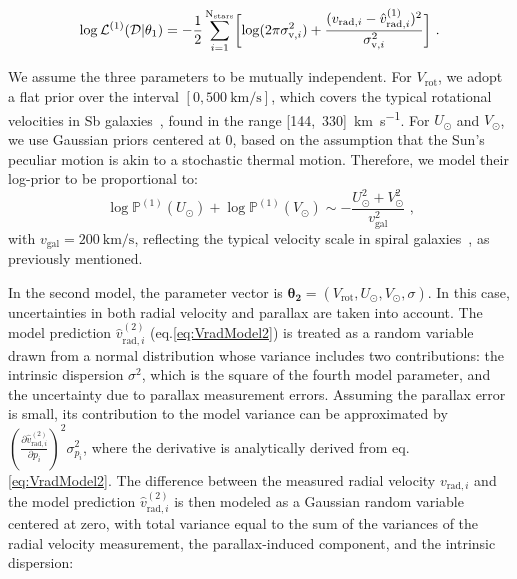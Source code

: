 \begin{equation}\label{Eq:LogLikeMod1}
    \log \mathcal{L}^{(1)}(\mathcal{D} \vert \theta_1) = -\frac{1}{2}\sum_{i=1}^{\text{N}_{\text{stars}}}\biggl[\log(2\pi\sigma_{\text{v},i}^2)+\frac{(v_{\text{rad},i} - \hat{v}_{\text{rad},i}^{(1)})^2}{\sigma_{\text{v},i}^2}\biggr] \text{ .}
\end{equation}

We assume the three parameters to be mutually independent. For $V_{\text{rot}}$, we adopt a flat prior over the interval $[0,\qty{500}{\kilo\meter\per\second}]$, which covers the typical rotational velocities in Sb galaxies~\cite{Schneider2015}, found in the range [144,~330]~\unit{\kilo\meter\per\second}\cite{Schneider2015}. For $U_\odot$ and $V_\odot$, we use Gaussian priors centered at 0, based on the assumption that the Sun's peculiar motion is akin to a stochastic thermal motion. Therefore, we model their log-prior to be proportional to:
\begin{equation*}
    \log\mathbb{P}^{(1)}(U_\odot) + \log\mathbb{P}^{(1)}(V_\odot) \sim - \frac{U_\odot^2 + V_{\odot}^2}{v_{\text{gal}}^2} \text{ ,}
\end{equation*}
\noindent
with $v_{\text{gal}} = \qty{200}{\kilo\meter\per\second}$, reflecting the typical velocity scale in spiral galaxies~\cite{Schneider2015}, as previously mentioned.

In the second model, the parameter vector is $\mathbf{\theta_2} = (V_{\text{rot}}, U_{\odot}, V_{\odot}, \sigma)$. In this case, uncertainties in both radial velocity and parallax are taken into account. 
The model prediction \(\hat{v}^{(2)}_{\text{rad}, i}\) (eq.\ref{eq:VradModel2}) is treated as a random variable drawn from a normal distribution whose variance includes two contributions: the intrinsic dispersion \(\sigma^2\), which is the square of the fourth model parameter, and the uncertainty due to parallax measurement errors.
Assuming the parallax error is small, its contribution to the model variance can be approximated by \(\left( \frac{\partial \hat{v}^{(2)}_{\text{rad}, i}}{\partial p_i} \right)^2 \sigma^2_{p_i}\), where the derivative is analytically derived from eq.\ref{eq:VradModel2}. 
The difference between the measured radial velocity \(v_{\text{rad}, i}\) and the model prediction \(\hat{v}^{(2)}_{\text{rad}, i}\) is then modeled as a Gaussian random variable centered at zero, with total variance equal to the sum of the variances of the radial velocity measurement, the parallax-induced component, and the intrinsic dispersion:

